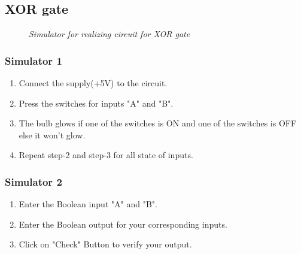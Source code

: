 	\subsection{XOR gate}
		\begin{figure}[ht]
			\centering 
			\hfill
			\caption{\textit{Simulator for realizing circuit for XOR gate}}
		\end{figure}
		\subsubsection{Simulator 1}
			\begin{enumerate}
				\tightlist
				\item Connect the supply(+5V) to the circuit.
				\item Press the switches for inputs "A" and "B".			
				\item The bulb glows if one of the switches is ON and one of the switches is OFF else it won't glow.
				\item Repeat step-2 and step-3 for all state of inputs.
			\end{enumerate}
		\subsubsection{Simulator 2}
			\begin{enumerate}
				\tightlist
				\item Enter the Boolean input "A" and "B".
				\item Enter the Boolean output for your corresponding inputs.
				\item Click on "Check" Button to verify your output.			
			\end{enumerate}	

